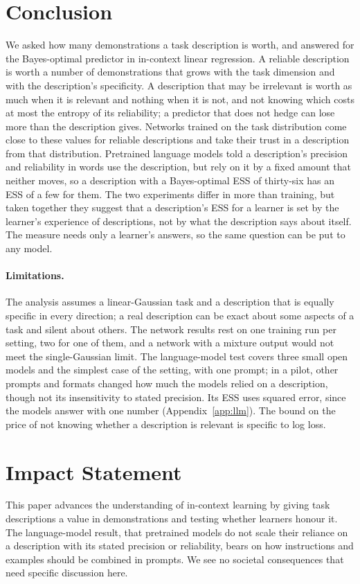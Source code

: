 \documentclass{article}
\begin{document}
\section{Conclusion}
We asked how many demonstrations a task description is worth, and answered for the Bayes-optimal predictor in in-context linear regression. A reliable description is worth a number of demonstrations that grows with the task dimension and with the description's specificity. A description that may be irrelevant is worth as much when it is relevant and nothing when it is not, and not knowing which costs at most the entropy of its reliability; a predictor that does not hedge can lose more than the description gives. Networks trained on the task distribution come close to these values for reliable descriptions and take their trust in a description from that distribution. Pretrained language models told a description's precision and reliability in words use the description, but rely on it by a fixed amount that neither moves, so a description with a Bayes-optimal ESS of thirty-six has an ESS of a few for them. The two experiments differ in more than training, but taken together they suggest that a description's ESS for a learner is set by the learner's experience of descriptions, not by what the description says about itself. The measure needs only a learner's answers, so the same question can be put to any model.

\paragraph{Limitations.} The analysis assumes a linear-Gaussian task and a description that is equally specific in every direction; a real description can be exact about some aspects of a task and silent about others. The network results rest on one training run per setting, two for one of them, and a network with a mixture output would not meet the single-Gaussian limit. The language-model test covers three small open models and the simplest case of the setting, with one prompt; in a pilot, other prompts and formats changed how much the models relied on a description, though not its insensitivity to stated precision. Its ESS uses squared error, since the models answer with one number (Appendix~\ref{app:llm}). The bound on the price of not knowing whether a description is relevant is specific to log loss.

\section*{Impact Statement}
This paper advances the understanding of in-context learning by giving task descriptions a value in demonstrations and testing whether learners honour it. The language-model result, that pretrained models do not scale their reliance on a description with its stated precision or reliability, bears on how instructions and examples should be combined in prompts. We see no societal consequences that need specific discussion here.
\end{document}
